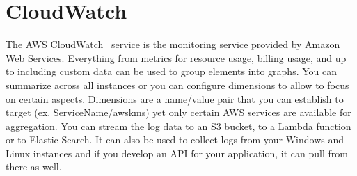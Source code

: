 \section{CloudWatch}

The AWS CloudWatch~\cite{hid-sp18-518-CloudWatch} service is the monitoring 
service provided by Amazon Web Services. Everything from metrics for resource
usage, billing usage, and up to including custom data can be used to 
group elements into graphs. You can summarize across all instances or you
can configure dimensions to allow to focus on certain aspects. Dimensions are
a name/value pair that you can establish to target (ex. ServiceName/awskms) yet
only certain AWS services are available for aggregation. You can stream the 
log data to an S3 bucket, to a Lambda function or to Elastic Search. It can 
also be used to collect logs from your Windows and Linux instances and if
you develop an API for your application, it can pull from there as well.











